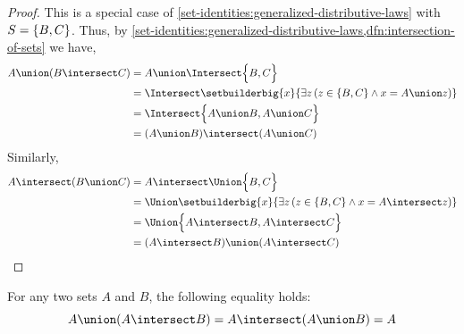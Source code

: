\begin{proof}
    This is a special case of \cref{set-identities:generalized-distributive-laws} with
    \( S = \mleft\{ B, C \mright\} \).
    Thus, by \cref{set-identities:generalized-distributive-laws,dfn:intersection-of-sets} we have,
    \begin{align*}
        A \union \mleft( B \intersect C \mright)
        &=
        A \union \Intersect \Big\{ B, C \Big\} \\
        &=
        \Intersect \setbuilderbig{x}{\exists z \, \mleft( z \in \mleft\{ B,C \mright\} \land x = A \union z \mright)}\\
        &=
        \Intersect \Big\{ A \union B, A \union C \Big\} \\
        &=
        \mleft( A \union B \mright) \intersect \mleft( A \union C \mright)
    \end{align*}
    Similarly,
    \begin{align*}
        A \intersect \mleft( B \union C \mright)
        &=
        A \intersect \Union \Big\{ B, C \Big\}\\
        &=
        \Union \setbuilderbig{x}{\exists z \, \mleft( z \in \mleft\{ B,C \mright\} \land x = A \intersect z \mright)}\\
        &=
        \Union \Big\{ A \intersect B, A \intersect C \Big\}\\
        &=
        \mleft( A \intersect B \mright) \union \mleft( A \intersect C \mright) \qedhere
    \end{align*}
\end{proof}

\begin{thm}
    \label{thm:absorption-laws-of-union-and-intersection}
    For any two sets \( A \) and \( B \), the following equality holds:
    \begin{equation*}
        A \union \mleft( A \intersect B \mright) = A \intersect \mleft( A \union B \mright) = A
    \end{equation*}
\end{thm}

